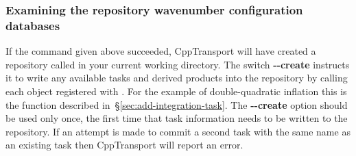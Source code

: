 \documentclass[11pt,a4paper]{article}
\renewcommand{\texttt}[1]{{\ttfamily\fontseries{l}\selectfont{#1}}}
\newcommand{\packagefont}{\sffamily}
\newcommand{\CppTransport}{{\packagefont CppTransport}}
\newcommand{\file}[1]{\texttt{{#1}}}
\newcommand{\option}[1]{{\ttfamily\bfseries\small #1}}
\begin{document}
\subsubsection{Examining the repository wavenumber configuration databases}
\label{sec:examine-k-database}
If the \texttt{mpiexec} command given above succeeded,
{\CppTransport} will have created a repository called
\file{test-repo} in your current working directory.
The switch
\option{{-}{-}create} instructs it
to write any available tasks and derived products
into the repository by calling each object
registered with \texttt{add_generator()}.
For the example of double-quadratic inflation this is the
function \texttt{write_tasks()} described
in~\S\ref{sec:add-integration-task}.
The \option{{-}{-}create} option should be used only
once, the first time that task information needs to be
written to the repository.
If an attempt is made to commit a second task with the
same name as an existing task
then {\CppTransport} will report an error.
\end{document}
